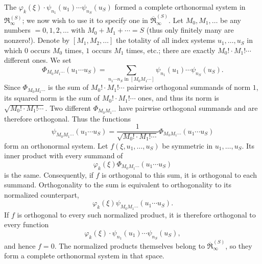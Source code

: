 \documentclass[fontsize=13pt,twoside,openany,headings=normal,parskip=false,bookmarkpackage=false,DIV=calc]{scrbook}
\begin{document}
The $\varphi_k(\xi)\cdot\psi_{n_1}(u_1)\cdots\psi_{n_S}(u_S)$ formed a complete orthonormal system in $\mathfrak R_{\infty}^{(S)}$; we now wish to use it to specify one in $\overline{\mathfrak R}_{\infty}^{(S)}$. Let $M_0,M_1,\ldots$ be any numbers $=0,1,2,\ldots$ with $M_0+M_1+\cdots=S$ (thus only finitely many are nonzero!). Denote by $[M_1,M_2,\ldots]$ the totality of all index systems $u_1,\ldots,u_S$ in which $0$ occurs $M_0$ times, $1$ occurs $M_1$ times, etc.; there are exactly $M_0!\cdot M_1!\cdots$ different ones. We set
\[
 \Phi_{M_0M_1\cdots}(u_1\cdots u_S)
 =\sum_{n_1\cdots n_S\text{ in }[M_0M_1\cdots]}
 \psi_{n_1}(u_1)\cdots\psi_{n_S}(u_S).
\]
Since $\Phi_{M_0M_1\cdots}$ is the sum of $M_0!\cdot M_1!\cdots$ pairwise orthogonal summands of norm $1$, its squared norm is the sum of $M_0!\cdot M_1!\cdots$ ones, and thus its norm is $\sqrt{M_0!\cdot M_1!\cdots}$. Two different $\Phi_{M_0M_1\cdots}$ have pairwise orthogonal summands and are therefore orthogonal. Thus the functions
\[
 \psi_{M_0M_1\cdots}(u_1\cdots u_S)
 =\frac1{\sqrt{M_0!\cdot M_1!\cdots}}\Phi_{M_0M_1\cdots}(u_1\cdots u_S)
\]
form an orthonormal system.
Let $f(\xi,u_1,\ldots,u_S)$ be symmetric in $u_1,\ldots,u_S$. Its inner product with every summand of
\[
 \varphi_k(\xi)\Phi_{M_0M_1\cdots}(u_1\cdots u_S)
\]
is the same. Consequently, if $f$ is orthogonal to this sum, it is orthogonal to each summand. Orthogonality to the sum is equivalent to orthogonality to its normalized counterpart,
\[
 \varphi_k(\xi)\psi_{M_0M_1\cdots}(u_1\cdots u_S).
\]
If $f$ is orthogonal to every such normalized product, it is therefore orthogonal to every function
\[
 \varphi_k(\xi)\cdot\psi_{n_1}(u_1)\cdots\psi_{n_S}(u_S),
\]
and hence $f=0$. The normalized products themselves belong to $\overline{\mathfrak R}_{\infty}^{(S)}$, so they form a complete orthonormal system in that space.
\end{document}
